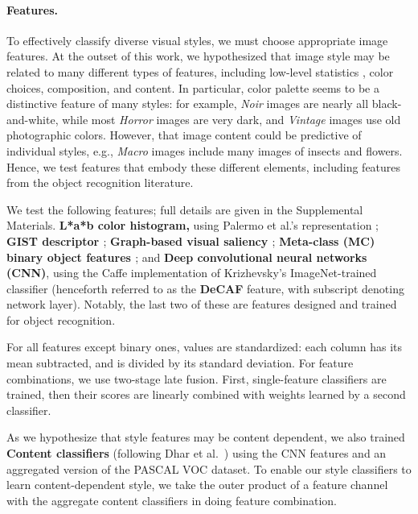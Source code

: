 \paragraph{Features.}
To effectively classify diverse visual styles, we must choose appropriate image features.
At the outset of this work, we hypothesized that image style may be related to many different types of features, including low-level statistics \cite{Lyu-PNAS-2004}, color choices, composition, and content.  In particular, color palette seems to be a distinctive feature of many styles: for example, \emph{Noir} images are nearly all black-and-white, while most \emph{Horror} images are very dark, and \emph{Vintage} images use old photographic colors.  However,
that image content could be predictive of individual styles, e.g., \emph{Macro} images include many images of insects and flowers.
 Hence, we test features that embody these different elements, including features from the object recognition literature.

 We test the following features; full details are given in the Supplemental Materials.
\textbf{L*a*b color histogram,} using Palermo et al.'s representation \cite{Palermo-ECCV-2012};
\textbf{GIST descriptor \cite{Oliva-IJCV-2001} };
\textbf{Graph-based visual saliency \cite{Harel-NIPS-2006}};
\textbf{Meta-class (MC) binary object features \cite{Bergamo-CVPR-2012}}; and
\textbf{Deep convolutional neural networks (CNN)}, using the Caffe \cite{Jia13caffe} implementation of Krizhevsky's ImageNet-trained classifier \cite{krizhevsky2012imagenet} (henceforth referred to as the \textbf{DeCAF} feature, with subscript denoting network layer).
Notably, the last two of these are features designed and trained for object recognition.

For all features except binary ones, values are standardized: each column has its mean subtracted, and is divided by its standard deviation.
For feature combinations, we use two-stage late fusion.
First, single-feature classifiers are trained, then their scores are linearly combined with weights learned by a second classifier.

As we hypothesize that style features may be content dependent, we also trained \textbf{Content classifiers} (following Dhar et al.~\cite{Dhar-CVPR-2011}) using the CNN features and an aggregated version of the PASCAL VOC \cite{pascal-voc-2010} dataset. To enable our style classifiers to learn content-dependent style, we take the outer product of a feature channel with the aggregate content classifiers in doing feature combination.
